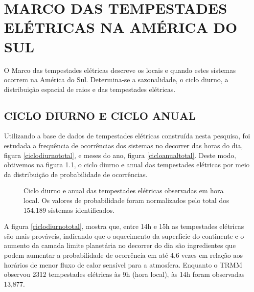 \chapter{MARCO DAS TEMPESTADES ELÉTRICAS NA AMÉRICA DO SUL}

O Marco das tempestades elétricas descreve os locais e quando estes sistemas ocorrem na América do Sul. Determina-se a sazonalidade, o ciclo diurno, a distribuição espacial de raios e das tempestades elétricas. 


\section{CICLO DIURNO E CICLO ANUAL}

Utilizando a base de dados de tempestades elétricas construída nesta pesquisa, foi estudada a frequência de ocorrências dos sistemas no decorrer das horas do dia, figura \ref{ciclodiurnototal}, e meses do ano, figura \ref{cicloanualtotal}. Deste modo, obtivemos na figura \ref{diurnoanual}, o ciclo diurno e anual das tempestades elétricas por meio da distribuição de probabilidade de ocorrências.

\begin{figure}[!hb]
\caption{Ciclo diurno e anual das tempestades elétricas observadas em hora local. Os valores de probabilidade foram normalizados pelo total dos 154,189 sistemas identificados.}
\label{diurnoanual} 
\end{figure} 

A figura \ref{ciclodiurnototal},  mostra que, entre 14h e 15h as tempestades elétricas são mais prováveis, indicando que o aquecimento da superfície do continente e o aumento da camada limite planetária no decorrer do dia são ingredientes que podem aumentar a probabilidade de ocorrência em até 4,6 vezes em relação aos horários de menor fluxo de calor sensível para a atmosfera. Enquanto o TRMM observou 2312 tempestades elétricas às 9h (hora local), às 14h foram observadas 13,877.

